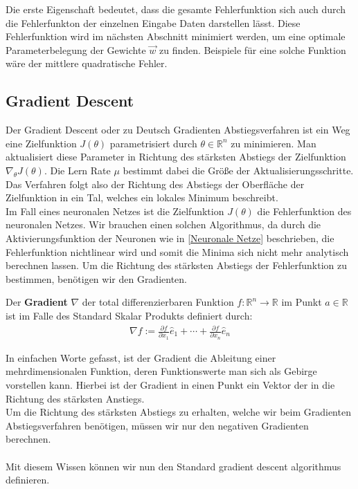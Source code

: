 Die erste Eigenschaft bedeutet, dass die gesamte Fehlerfunktion 
sich auch durch die Fehlerfunkton der einzelnen Eingabe Daten darstellen lässt.
Diese Fehlerfunktion wird im nächsten Abschnitt minimiert werden, um
eine optimale Parameterbelegung der Gewichte $\vec{w}$ zu finden. 
Beispiele für eine solche Funktion wäre der 
mittlere quadratische Fehler.

\subsection{Gradient Descent}\label{Gradient Descent}

Der Gradient Descent oder zu Deutsch Gradienten Abstiegsverfahren
ist ein Weg eine Zielfunktion $J(\theta)$ parametrisiert durch $\theta \in \mathbb{R}^n$
zu minimieren. Man aktualisiert diese Parameter in Richtung des stärksten Abstiegs
der Zielfunktion $\nabla_\theta J(\theta)$. Die Lern Rate $\mu$ bestimmt
dabei die Größe der Aktualisierungsschritte. Das Verfahren folgt 
also der Richtung des Abstiegs der Oberfläche der Zielfunktion in ein Tal,
welches ein lokales Minimum
beschreibt. \cite[Kapitel 1]{Ruder.9152016} \\

Im Fall eines neuronalen Netzes ist die Zielfunktion $J(\theta)$ die
Fehlerfunktion des neuronalen Netzes. 
Wir brauchen einen solchen Algorithmus, da durch die Aktivierungsfunktion der Neuronen
wie in \ref{Neuronale Netze} beschrieben, die Fehlerfunktion nichtlinear wird und somit
die Minima sich nicht mehr analytisch berechnen lassen.
Um die Richtung des stärksten Abstiegs der Fehlerfunktion zu bestimmen, benötigen
wir den Gradienten.


\begin{definition}
    \cite{Konigsberger.2002}
    Der \textbf{Gradient} $\nabla$ der total differenzierbaren Funktion
    $f:\mathbb{R}^n \rightarrow \mathbb{R}$ im Punkt $a\in\mathbb{R}$ ist im
    Falle des Standard Skalar Produkts definiert durch:
    \begin{align}
        \nabla f := \frac{\partial f}{\partial x_{1}}\hat{e}_{1}+\cdots+\frac{\partial f}{\partial x_{n}}\hat{e}_{n}
    \end{align}
\end{definition}

In einfachen Worte gefasst, ist der Gradient die Ableitung einer mehrdimensionalen
Funktion, deren Funktionswerte man sich als Gebirge vorstellen kann.
Hierbei ist der Gradient in einen Punkt ein Vektor der in die Richtung des 
stärksten Anstiegs. \\
Um die Richtung des stärksten Abstiegs zu erhalten, welche wir beim Gradienten
Abstiegsverfahren benötigen, müssen wir nur den negativen Gradienten berechnen. \\\\
Mit diesem Wissen können wir nun den Standard gradient descent algorithmus definieren.

